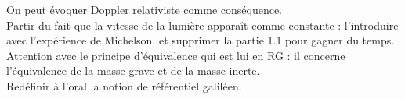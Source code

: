 \documentclass[12pt,prb,aps,epsf]{article}
\begin{document}
On peut évoquer Doppler relativiste comme conséquence.\\

Partir du fait que la vitesse de la lumière apparaît comme constante : l'introduire avec l'expérience de Michelson, et supprimer la partie 1.1 pour gagner du temps.\\

Attention avec le principe d'équivalence qui est lui en RG : il concerne l'équivalence de la masse grave et de la masse inerte.\\

Redéfinir à l'oral la notion de référentiel galiléen.
\end{document}

